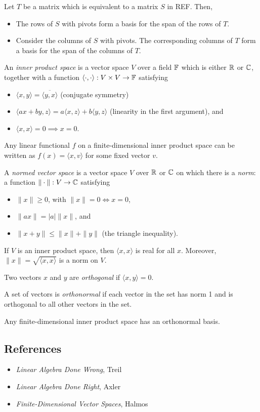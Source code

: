 \begin{prop}
  Let $T$ be a matrix which is equivalent to a matrix $S$ in REF\@. Then,
  \begin{itemize}
    \item The rows of $S$ with pivots form a basis for the span of the rows of $T$.
    \item Consider the columns of $S$ with pivots. The corresponding columns of
      $T$ form a basis for the span of the columns of $T$.
  \end{itemize}
\end{prop}
\begin{defn}
  An \emph{inner product space} is a vector space $V$ over a field $\mathbb{F}$ which
  is either $\mathbb{R}$ or $\mathbb{C}$, together with a function
  $\langle\cdot,\cdot\rangle:V\times V\to\mathbb{F}$ satisfying
  \begin{itemize}
    \item $\langle  x, y\rangle=\overline{\langle 
      y, x\rangle}$ (conjugate
      symmetry)
    \item $\langle a x+b y, z\rangle=a\langle
      x, z\rangle+b\langle y, z\rangle$ (linearity in the
      first argument), and
    \item $\langle x, x\rangle=0\implies x= 0$.
  \end{itemize}
\end{defn}
\begin{prop}
  Any linear functional $f$ on a finite-dimensional inner product space can be
  written as $f(x)=\langle x,v\rangle$ for some fixed vector $v$.
\end{prop}
\begin{defn}
  A \emph{normed vector space} is a vector space $V$ over $\mathbb{R}$ or $\mathbb{C}$
  on which there is a \emph{norm}: a function $\|\cdot\|:V\to\mathbb{C}$ satisfying
  \begin{itemize}
    \item $\| x\|\ge 0$, with $\|x\|=0\iff x=0$,
    \item $\|a x\|=|a|\| x\|$, and
    \item $\| x+ y\|\le\| x\|+\| y\|$ (the triangle
      inequality).
  \end{itemize}
\end{defn}
\begin{prop}
  If $V$ is an inner product space, then $\langle x, x\rangle$ is
  real for all $ x$.
  Moreover, $\| x\|=\sqrt{\langle x, x\rangle}$ is a norm
  on $V$.
\end{prop}
\begin{defn}
  Two vectors $ x$ and $ y$ are \emph{orthogonal} if $\langle
   x, y\rangle=0$.

  A set of vectors is \emph{orthonormal} if each vector in the set has norm 1
  and is orthogonal to all other vectors in the set.
\end{defn}
\begin{prop}
  Any finite-dimensional inner product space has an orthonormal basis.
\end{prop}

\subsection*{References}
\begin{itemize}
  \item \emph{Linear Algebra Done Wrong}, Treil
  \item \emph{Linear Algebra Done Right}, Axler
  \item \emph{Finite-Dimensional Vector Spaces}, Halmos
\end{itemize}
